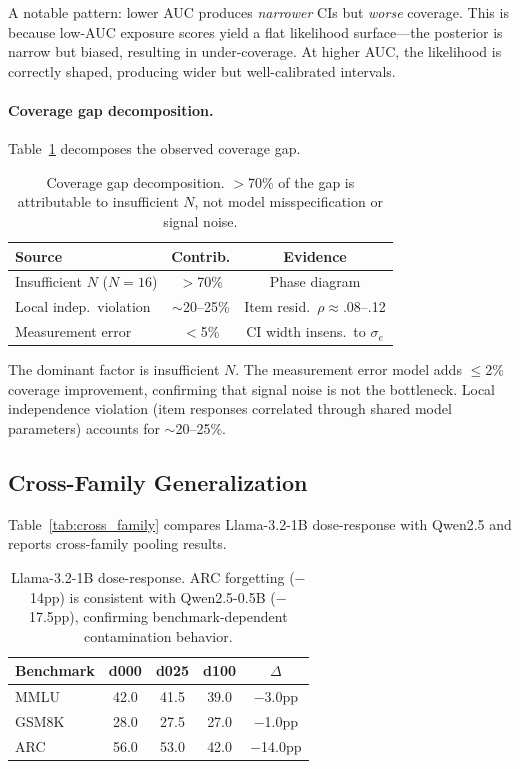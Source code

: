 \documentclass[11pt,a4paper]{article}
\begin{document}
A notable pattern: lower AUC produces \emph{narrower} CIs but \emph{worse} coverage. This is because low-AUC exposure scores yield a flat likelihood surface---the posterior is narrow but biased, resulting in under-coverage. At higher AUC, the likelihood is correctly shaped, producing wider but well-calibrated intervals.

\paragraph{Coverage gap decomposition.} Table~\ref{tab:coverage_gap} decomposes the observed coverage gap.

\begin{table}[t]
\centering
\small
\caption{Coverage gap decomposition. $>$70\% of the gap is attributable to insufficient $N$, not model misspecification or signal noise.}
\label{tab:coverage_gap}
\begin{tabular}{lcc}
\toprule
Source & Contrib. & Evidence \\
\midrule
Insufficient $N$ ($N{=}16$) & $>$70\% & Phase diagram \\
Local indep.\ violation & $\sim$20--25\% & Item resid.\ $\rho$$\approx$.08--.12 \\
Measurement error & $<$5\% & CI width insens.\ to $\sigma_e$ \\
\bottomrule
\end{tabular}
\end{table}

The dominant factor is insufficient $N$. The measurement error model adds $\leq$2\% coverage improvement, confirming that signal noise is not the bottleneck. Local independence violation (item responses correlated through shared model parameters) accounts for $\sim$20--25\%.

\subsection{Cross-Family Generalization}
\label{sec:cross_family}

Table~\ref{tab:cross_family} compares Llama-3.2-1B dose-response with Qwen2.5 and reports cross-family pooling results.

\begin{table}[t]
\centering
\small
\caption{Llama-3.2-1B dose-response. ARC forgetting ($-$14pp) is consistent with Qwen2.5-0.5B ($-$17.5pp), confirming benchmark-dependent contamination behavior.}
\label{tab:llama_dose}
\begin{tabular}{lcccc}
\toprule
Benchmark & d000 & d025 & d100 & $\Delta$ \\
\midrule
MMLU & 42.0 & 41.5 & 39.0 & $-$3.0pp \\
GSM8K & 28.0 & 27.5 & 27.0 & $-$1.0pp \\
ARC & 56.0 & 53.0 & 42.0 & $-$14.0pp \\
\bottomrule
\end{tabular}
\end{table}
\end{document}
